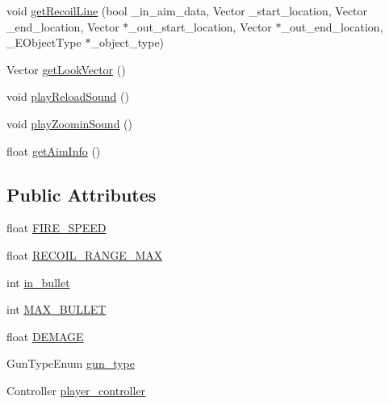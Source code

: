 \begin{DoxyCompactItemize}
void \hyperlink{class_weapons___actor_a8e5bd4c8a55510f6b7db7674273128fa}{get\+Recoil\+Line} (bool \+\_\+in\+\_\+aim\+\_\+data, Vector \+\_\+start\+\_\+location, Vector \+\_\+end\+\_\+location, Vector $\ast$\+\_\+out\+\_\+start\+\_\+location, Vector $\ast$\+\_\+out\+\_\+end\+\_\+location, \+\_\+\+E\+Object\+Type $\ast$\+\_\+object\+\_\+type)
\item 
Vector \hyperlink{class_weapons___actor_a6963343558cb76d4bf1d2ae105c35bff}{get\+Look\+Vector} ()
\item 
void \hyperlink{class_weapons___actor_a0c8b9ce144acf091d45cbb640409f76e}{play\+Reload\+Sound} ()
\item 
void \hyperlink{class_weapons___actor_a516b61bac1106db521e14a13655a2006}{play\+Zoomin\+Sound} ()
\item 
float \hyperlink{class_weapons___actor_a4075270dddcd840e6996ce3062acca46}{get\+Aim\+Info} ()
\end{DoxyCompactItemize}
\subsection*{Public Attributes}
\begin{DoxyCompactItemize}
\item 
float \hyperlink{class_weapons___actor_acb9cfe5f22387762744bf5badabe4336}{F\+I\+R\+E\+\_\+\+S\+P\+E\+ED}
\item 
float \hyperlink{class_weapons___actor_aa175cd3f4bb5dfd572fc56c966deb105}{R\+E\+C\+O\+I\+L\+\_\+\+R\+A\+N\+G\+E\+\_\+\+M\+AX}
\item 
int \hyperlink{class_weapons___actor_a3ada6991a9ec6db336c9ebc5af923c3d}{in\+\_\+bullet}
\item 
int \hyperlink{class_weapons___actor_a50e014c2ea202f57948e3cd81ca22491}{M\+A\+X\+\_\+\+B\+U\+L\+L\+ET}
\item 
float \hyperlink{class_weapons___actor_aea43a4cdbf104cbb2a46112a14488bfd}{D\+E\+M\+A\+GE}
\item 
Gun\+Type\+Enum \hyperlink{class_weapons___actor_a4707d7bf1fa123913b897bddfc0a2684}{gun\+\_\+type}
\item 
Controller \hyperlink{class_weapons___actor_aad6b8ee12d9a949b589c7b70721fd28a}{player\+\_\+controller}
\end{DoxyCompactItemize}
